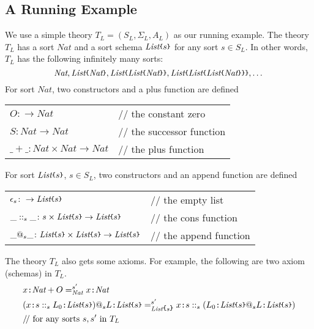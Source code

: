 \documentclass[UTF8,11pt]{article}
\theoremstyle{plain}
\theoremstyle{definition}
\theoremstyle{remark}
\newcommand{\cln}{\texttt{:}}
\newcommand{\Nat}{\textit{Nat}}
\newcommand{\List}{\textit{List}}
\newcommand{\parametric}[2]{{#1}\raisebox{.2ex}{\texttt{\footnotesize{\{}}}#2\raisebox{.2ex}{\texttt{\footnotesize{\}}}}}
\newcommand{\doubleslash}{/\!/{ }}
\begin{document}
\subsection{A Running Example}
We use a simple theory $T_L = (S_L, \Sigma_L, A_L)$ as our 
running example.
The theory $T_L$ has a sort $\Nat$ and a sort schema $\parametric{\List}{s}$ 
for any sort $s \in S_L$.
In other words, $T_L$ has the following infinitely many sorts:
$$\Nat, \parametric{\List}{\Nat},  
\parametric{\List}{\parametric{\List}{\Nat}}, 
\parametric{\List}{\parametric{\List}{\parametric{\List}{\Nat}}} ,\dots $$
For sort $\Nat$, two constructors and a plus function are defined
\begin{center}
\begin{tabular}{ll}
  $O \colon \to \Nat$       & \doubleslash the constant zero \\
  $S \colon \Nat \to \Nat$  & \doubleslash the successor function \\
  $\_+\_ \colon \Nat \times \Nat \to \Nat$ & \doubleslash the plus function
\end{tabular}
\end{center}
For sort $\parametric{\List}{s}$, $s \in S_L$, two constructors and an 
append
function are defined 
\begin{center}
	\begin{tabular}{ll}
		$\epsilon_s \colon \to \parametric{\List}{s}$       & 
		\doubleslash the empty list \\
		$\_::_s\_ \colon s \times \parametric{\List}{s} \to 
		\parametric{\List}{s}$  & 
		\doubleslash the cons function \\
		$\_@_s\_ \colon \parametric{\List}{s} \times \parametric{\List}{s} \to 
		\parametric{\List}{s}$ & \doubleslash the append function
	\end{tabular}
\end{center}
The theory $T_L$ also gets some axioms.
For example, the following are two axiom (schemas) in $T_L$.
\begin{align*}
& x \cln \Nat + O =_{\Nat}^{s'} x \cln \Nat \\
& (x \cln s ::_s L_0 \cln \parametric{\List}{s}) @_s L \cln 
\parametric{\List}{s}
=_{\parametric{\List}{s}}^{s'} x \cln s::_s (L_0 \cln 
\parametric{\List}{s}@_s L\cln \parametric{\List}{s}) \\
& \text{\doubleslash for any sorts $s, s'$ in $T_L$}
\end{align*}
\end{document}
